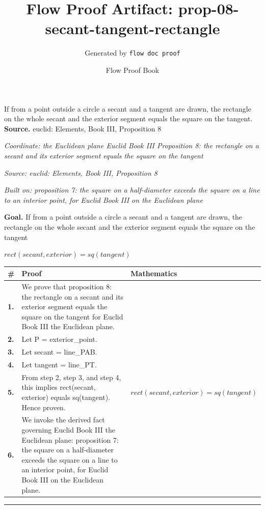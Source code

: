 \documentclass[11pt]{article}
\title{Flow Proof Artifact: prop-08-secant-tangent-rectangle}
\author{Generated by \texttt{flow doc proof}}
\date{Flow Proof Book}
\theoremstyle{definition}
\begin{document}
\maketitle
If from a point outside a circle a secant and a tangent are drawn, the rectangle on the whole secant and the exterior segment equals the square on the tangent.\\[0.5em]
\textbf{Source.} euclid: Elements, Book III, Proposition 8\\[0.5em]
\bigskip
{}\par
\smallskip\noindent\textit{Coordinate: the Euclidean plane \cdot Euclid Book III \cdot Proposition 8: the rectangle on a secant and its exterior segment equals the square on the tangent}\par
\smallskip\noindent\textit{Source: euclid: Elements, Book III, Proposition 8}\par
\smallskip\noindent\textit{Built on: proposition 7: the square on a half-diameter exceeds the square on a line to an interior point, for Euclid Book III on the Euclidean plane}\par
\medskip
\noindent\textbf{Goal.} If from a point outside a circle a secant and a tangent are drawn, the rectangle on the whole secant and the exterior segment equals the square on the tangent\par
\noindent$\displaystyle rect(secant, exterior) = sq(tangent)$\par
\medskip
\noindent
\begin{tabular}{@{} >{\raggedright\arraybackslash}p{} >{\raggedright\arraybackslash}p{} >{\raggedleft\arraybackslash}p{} @{}}
\textbf{\#} & \textbf{Proof} & \textbf{Mathematics} \\
\midrule
\textbf{1.} & We prove that proposition 8: the rectangle on a secant and its exterior segment equals the square on the tangent for Euclid Book III the Euclidean plane. & \\[0.45em]
\textbf{2.} & Let P = exterior\_point. & \\[0.45em]
\textbf{3.} & Let secant = line\_PAB. & \\[0.45em]
\textbf{4.} & Let tangent = line\_PT. & \\[0.45em]
\textbf{5.} & From step 2, step 3, and step 4, this implies rect(secant, exterior) equals sq(tangent). Hence proven. & $\displaystyle rect(secant, exterior) = sq(tangent)$ \\[0.45em]
\textbf{6.} & We invoke the derived fact governing Euclid Book III the Euclidean plane: proposition 7: the square on a half-diameter exceeds the square on a line to an interior point, for Euclid Book III on the Euclidean plane. & \\[0.45em]
\bottomrule
\end{tabular}
\label{thm:Geometry-Euclid Book III-proposition_8_the_rectangle_on_a_secant_and_its_exterior_segment_equals_the_square_on_the_tangent}
\par\medskip\hrule
\end{document}
